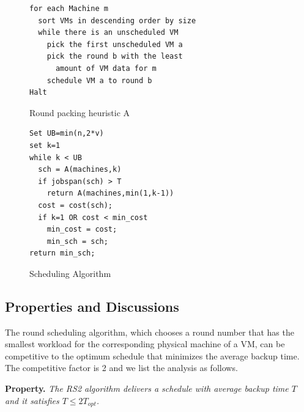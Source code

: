 {%
\begin{figure}
\begin{lstlisting}[frame=single]
for each Machine m
  sort VMs in descending order by size
  while there is an unscheduled VM
    pick the first unscheduled VM a
    pick the round b with the least
      amount of VM data for m
    schedule VM a to round b
Halt
\end{lstlisting}
\caption{Round packing heuristic A}
\label{fig-bpl}
\end{figure}

\begin{figure}
\begin{lstlisting}[frame=single]
Set UB=min(n,2*v)
set k=1
while k < UB
  sch = A(machines,k)
  if jobspan(sch) > T
    return A(machines,min(1,k-1))
  cost = cost(sch);
  if k=1 OR cost < min_cost
    min_cost = cost;
    min_sch = sch;
return min_sch;
\end{lstlisting}
\caption{Scheduling Algorithm}
\label{fig-scheduler}
\end{figure}

}

\subsection{Properties and Discussions}

The round scheduling algorithm, which chooses a round number that has the smallest
workload for the corresponding physical machine of a VM, can be competitive to
the optimum schedule that minimizes the average backup time.
The competitive factor is 2 and we list the analysis as follows. 


{\bf Property.}
{\it
The RS2 algorithm delivers a schedule with average backup time $T$ and
it satisfies $T \leq 2 T_{opt}$.
}

